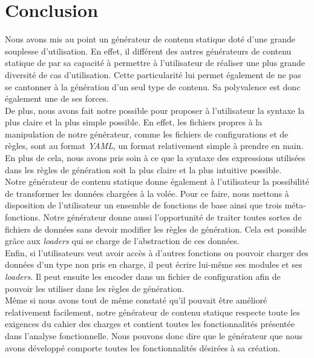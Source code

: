 \section{Conclusion}

	Nous avons mis au point un générateur de contenu statique doté d'une grande souplesse d'utilisation. En effet, il différent des autres générateurs de contenu statique de par sa capacité à permettre à l'utilisateur de réaliser une plus grande diversité de cas d'utilisation. Cette particularité lui permet également de ne pas se cantonner à la génération d'un seul type de contenu. Sa polyvalence est donc également une de ses forces.\\
	
	De plus, nous avons fait notre possible pour proposer à l'utilisateur la syntaxe la plus claire et la plus simple possible. En effet, les fichiers propres à la manipulation de notre générateur, comme les fichiers de configurations et de règles, sont au format \textit{YAML}, un format relativement simple à prendre en main. En plus de cela, nous avons pris soin à ce que la syntaxe des expressions utilisées dans les règles de génération soit la plus claire et la plus intuitive possible.\\
	
	Notre générateur de contenu statique donne également à l'utilisateur la possibilité de transformer les données chargées à la volée. Pour ce faire, nous mettons à disposition de l'utilisateur un ensemble de fonctions de base ainsi que trois méta-fonctions. Notre générateur donne aussi l'opportunité de traiter toutes sortes de fichiers de données sans devoir modifier les règles de génération. Cela est possible grâce aux \textit{loaders} qui se charge de l'abstraction de ces données.\\
	
	Enfin, si l'utilisateurs veut avoir accès à d'autres fonctions ou pouvoir charger des données d'un type non pris en charge, il peut écrire lui-même ses modules et ses \textit{loaders}. Il peut ensuite les encoder dans un fichier de configuration afin de pouvoir les utiliser dans les règles de génération.\\
	
	Même si nous avons tout de même constaté qu'il pouvait être amélioré relativement facilement, notre générateur de contenu statique respecte toute les exigences du cahier des charges et contient toutes les fonctionnalités présentée dans l'analyse fonctionnelle. Nous pouvons donc dire que le générateur que nous avons développé comporte toutes les fonctionnalités désirées à sa création.
